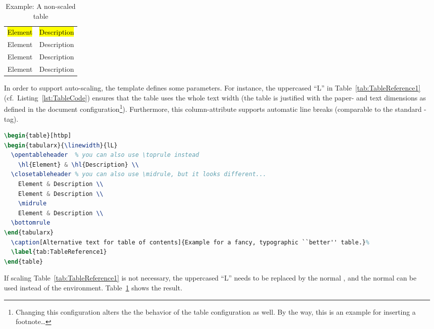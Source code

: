 \begin{table}[!ht]
\begin{center}
  \caption{Example: A non-scaled table}%
  \label{tab:TabNonScaled}
\begin{tabular} {ll}
	\opentableheader  %
		\hl{Element} & \hl{Description} \\
	\closetableheader %
		Element & Description \\
		Element & Description \\
		\midrule
		Element & Description \\
	\bottomrule
\end{tabular}
\end{center}
\end{table}

In order to support auto-scaling, the template defines some parameters. For instance, the uppercased ``L'' in Table~\ref{tab:TableReference1} (cf.\ Listing~\ref{lst:TableCode}) ensures that the table uses the whole text width (the table is justified with the paper- and text dimensions as defined in the document configuration\footnote{Changing this configuration alters the the behavior of the table configuration as well. By the way, this is an example for inserting a footnote\ldots}). Furthermore, this column-attribute supports automatic line breaks (comparable to the standard -tag).

\begin{lstlisting}[captionpos=b, language=TeX, commentstyle=\color{blue}\itshape, caption=Listing of the table printed above,label=lst:TableCode]
\begin{table}[htbp]
\begin{tabularx}{\linewidth}{lL}
  \opentableheader  % you can also use \toprule instead
	\hl{Element} & \hl{Description} \\
  \closetableheader % you can also use \midrule, but it looks different...
	Element & Description \\
	Element & Description \\
	\midrule
	Element & Description \\
  \bottomrule
\end{tabularx}
  \caption[Alternative text for table of contents]{Example for a fancy, typographic ``better'' table.}%
  \label{tab:TableReference1}
\end{table}
\end{lstlisting}

If scaling Table~\ref{tab:TableReference1} is not necessary, the uppercased ``L'' needs to be replaced by the normal , and the normal  can be used instead of the  environment. Table~\ref{tab:TabNonScaled} shows the result.

